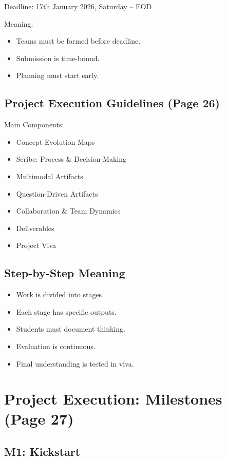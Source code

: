 \documentclass[12pt]{article}
\begin{document}
Deadline: 17th January 2026, Saturday -- EOD

Meaning:

\begin{itemize}
\item Teams must be formed before deadline.
\item Submission is time-bound.
\item Planning must start early.
\end{itemize}

\subsection{Project Execution Guidelines (Page 26)}

Main Components:

\begin{itemize}
\item Concept Evolution Maps
\item Scribe: Process \& Decision-Making
\item Multimodal Artifacts
\item Question-Driven Artifacts
\item Collaboration \& Team Dynamics
\item Deliverables
\item Project Viva
\end{itemize}

\subsection*{Step-by-Step Meaning}

\begin{itemize}
\item Work is divided into stages.
\item Each stage has specific outputs.
\item Students must document thinking.
\item Evaluation is continuous.
\item Final understanding is tested in viva.
\end{itemize}

\section{Project Execution: Milestones (Page 27)}

\subsection{M1: Kickstart}
\end{document}
